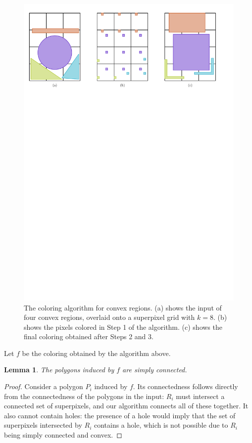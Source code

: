\documentclass[a4paper, 11pt]{article}
\newtheorem{lemma}{Lemma}
\begin{document}
\begin{figure}
\centering
\includegraphics[width=\textwidth]{Figures/convexprojection.pdf}
\caption{The coloring algorithm for convex regions. (a) shows the input of four convex regions, overlaid onto a superpixel grid with \(k = 8\). (b) shows the pixels colored in Step 1 of the algorithm. (c) shows the final coloring obtained after Steps 2 and 3.}
\label{fig:convexprojection}
\end{figure}

Let \(f\) be the coloring obtained by the algorithm above.

\begin{lemma}\label{lem:convex-simply-connected}
	The polygons induced by \(f\) are simply connected.
\end{lemma}
\begin{proof}
	Consider a polygon \(P_i\) induced by \(f\). Its connectedness follows directly from the connectedness of the polygons in the input: \(R_i\) must intersect a connected set of superpixels, and our algorithm connects all of these together. It also cannot contain holes: the presence of a hole would imply that the set of superpixels intersected by \(R_i\) contains a hole, which is not possible due to \(R_i\) being simply connected and convex.
\end{proof}
\end{document}
